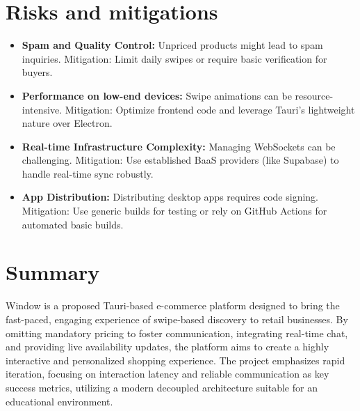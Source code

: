 \documentclass[11pt,a4paper]{article}
\begin{document}
\section{Risks and mitigations}
\begin{itemize}[leftmargin=0.7cm]
    \item \textbf{Spam and Quality Control:} Unpriced products might lead to spam inquiries. Mitigation: Limit daily swipes or require basic verification for buyers.
    \item \textbf{Performance on low-end devices:} Swipe animations can be resource-intensive. Mitigation: Optimize frontend code and leverage Tauri's lightweight nature over Electron.
    \item \textbf{Real-time Infrastructure Complexity:} Managing WebSockets can be challenging. Mitigation: Use established BaaS providers (like Supabase) to handle real-time sync robustly.
    \item \textbf{App Distribution:} Distributing desktop apps requires code signing. Mitigation: Use generic builds for testing or rely on GitHub Actions for automated basic builds.
\end{itemize}

\section{Summary}
Window is a proposed Tauri-based e-commerce platform designed to bring the fast-paced, engaging experience of swipe-based discovery to retail businesses. By omitting mandatory pricing to foster communication, integrating real-time chat, and providing live availability updates, the platform aims to create a highly interactive and personalized shopping experience. The project emphasizes rapid iteration, focusing on interaction latency and reliable communication as key success metrics, utilizing a modern decoupled architecture suitable for an educational environment.
\end{document}
